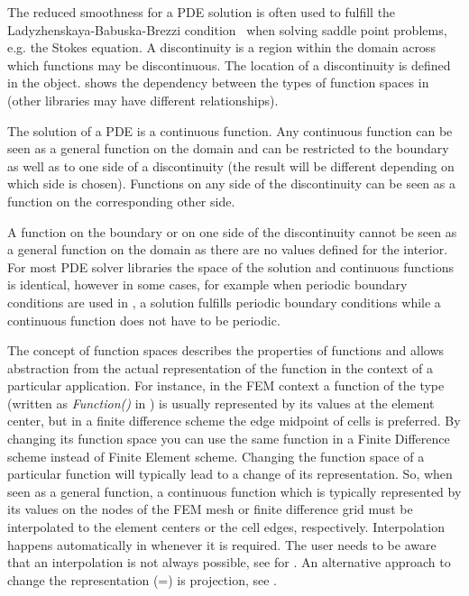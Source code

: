The reduced smoothness for a PDE solution is often used to fulfill the
Ladyzhenskaya-Babuska-Brezzi condition~\cite{LBB} when solving saddle point
problems, e.g. the Stokes equation.
A discontinuity is a region within the domain across
which functions may be discontinuous.
The location of a discontinuity is defined in the \Domain object.
 shows the dependency between the types of function spaces
in \finley (other libraries may have different relationships).

The solution of a PDE is a continuous function. Any continuous function can
be seen as a general function on the domain and can be restricted to the
boundary as well as to one side of a discontinuity (the result will be
different depending on which side is chosen). Functions on any side of the
discontinuity can be seen as a function on the corresponding other side.

A function on the boundary or on one side of the discontinuity cannot be seen
as a general function on the domain as there are no values defined for the
interior. For most PDE solver libraries the space of the solution and
continuous functions is identical, however in some cases, for example when
periodic boundary conditions are used in \finley, a solution fulfills periodic
boundary conditions while a continuous function does not have to be periodic.

The concept of function spaces describes the properties of functions and
allows abstraction from the actual representation of the function in the
context of a particular application. For instance, in the FEM context a
function of the \Function type (written as \emph{Function()} in )
is usually represented by its values at the element center,
but in a finite difference scheme the edge midpoint of cells is preferred.
By changing its function space you can use the same function in a Finite
Difference scheme instead of Finite Element scheme.
Changing the function space of a particular function will typically lead to
a change of its representation.
So, when seen as a general function, a continuous function which is typically
represented by its values on the nodes of the FEM mesh or finite difference
grid must be interpolated to the element centers or the cell edges,
respectively. Interpolation happens automatically in \escript whenever it is
required. The user needs to be aware that an
interpolation is not always possible, see  for \finley.
An alternative approach to change the representation (=\FunctionSpace) is
projection, see .

